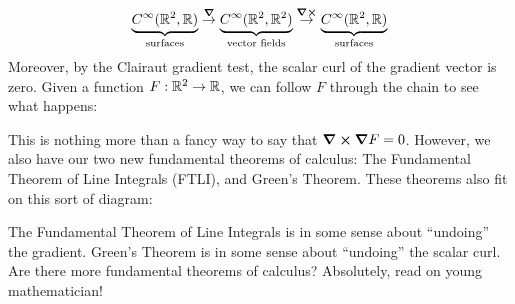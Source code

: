 \documentclass{ximera}
\begin{document}
\[
\underbrace{C^{\infty}(\mathbb R^2,\mathbb R)}_{\text{surfaces}} \overset{\boldsymbol\nabla}{\to}\underbrace{C^\infty(\mathbb R^2,\mathbb R^2)}_{\text{vector fields}} \overset{\boldsymbol\nabla\boldsymbol\times}{\to}\underbrace{C^\infty(\mathbb R^2,\mathbb R)}_{\text{surfaces}} 
\]
Moreover, by the Clairaut gradient test, the scalar curl of the
gradient vector is zero. Given a function $F:\mathbb R^2\to\mathbb R$, we can follow
$F$ through the chain to see what happens:
\begin{image}
\end{image}
This is nothing more than a fancy way to say that $\boldsymbol\nabla\boldsymbol\times\boldsymbol\nabla F =
0$. However, we also have our two new fundamental theorems of
calculus: The Fundamental Theorem of Line Integrals (FTLI), and
Green's Theorem. These theorems also fit on this sort of diagram:
\begin{image}
\end{image}
 The Fundamental Theorem of Line Integrals is in some sense about
 ``undoing'' the gradient. Green's Theorem is in some sense about
 ``undoing'' the scalar curl. Are there more fundamental theorems of
 calculus? Absolutely, read on young mathematician!
\end{document}

